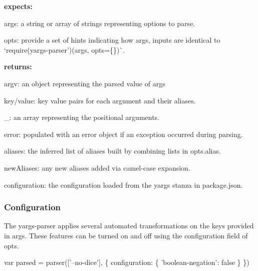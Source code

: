 {\bfseries expects\+:}


\begin{DoxyItemize}
\item {\ttfamily args}\+: a string or array of strings representing options to parse.
\item {\ttfamily opts}\+: provide a set of hints indicating how {\ttfamily args}, inputs are identical to `require(\textquotesingle{}yargs-\/parser')(args, opts=\{\})\`{}.
\end{DoxyItemize}

{\bfseries returns\+:}


\begin{DoxyItemize}
\item {\ttfamily argv}\+: an object representing the parsed value of {\ttfamily args}
\begin{DoxyItemize}
\item {\ttfamily key/value}\+: key value pairs for each argument and their aliases.
\item {\ttfamily \+\_\+}\+: an array representing the positional arguments.
\end{DoxyItemize}
\item {\ttfamily error}\+: populated with an error object if an exception occurred during parsing.
\item {\ttfamily aliases}\+: the inferred list of aliases built by combining lists in {\ttfamily opts.\+alias}.
\item {\ttfamily new\+Aliases}\+: any new aliases added via camel-\/case expansion.
\item {\ttfamily configuration}\+: the configuration loaded from the {\ttfamily yargs} stanza in package.\+json.
\end{DoxyItemize}

\label{_configuration}%


\subsubsection*{Configuration}

The yargs-\/parser applies several automated transformations on the keys provided in {\ttfamily args}. These features can be turned on and off using the {\ttfamily configuration} field of {\ttfamily opts}.


\begin{DoxyCode}
var parsed = parser(['--no-dice'], \{
  configuration: \{
    'boolean-negation': false
  \}
\})
\end{DoxyCode}


